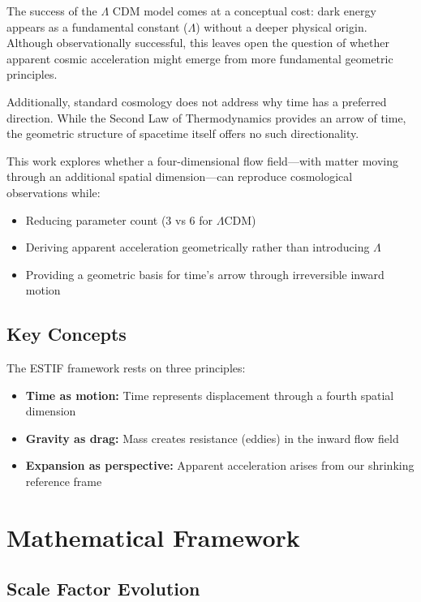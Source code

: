 \documentclass[12pt,a4paper]{article}
\begin{document}
The success of the $\Lambda$ CDM model comes at a conceptual cost: dark energy appears as a fundamental constant ($\Lambda$) without a deeper physical origin. Although observationally successful, this leaves open the question of whether apparent cosmic acceleration might emerge from more fundamental geometric principles.

Additionally, standard cosmology does not address why time has a preferred direction. While the Second Law of Thermodynamics provides an arrow of time, the geometric structure of spacetime itself offers no such directionality.

This work explores whether a four-dimensional flow field---with matter moving through an additional spatial dimension---can reproduce cosmological observations while:

\begin{itemize}
\item Reducing parameter count (3 vs 6 for $\Lambda$CDM)
\item Deriving apparent acceleration geometrically rather than introducing $\Lambda$
\item Providing a geometric basis for time's arrow through irreversible inward motion
\end{itemize}

\subsection{Key Concepts}

The ESTIF framework rests on three principles:
\begin{itemize}
\item \textbf{Time as motion:} Time represents displacement through a fourth spatial dimension
\item \textbf{Gravity as drag:} Mass creates resistance (eddies) in the inward flow field
\item \textbf{Expansion as perspective:} Apparent acceleration arises from our shrinking reference frame
\end{itemize}

\section{Mathematical Framework}

\subsection{Scale Factor Evolution}
\end{document}
